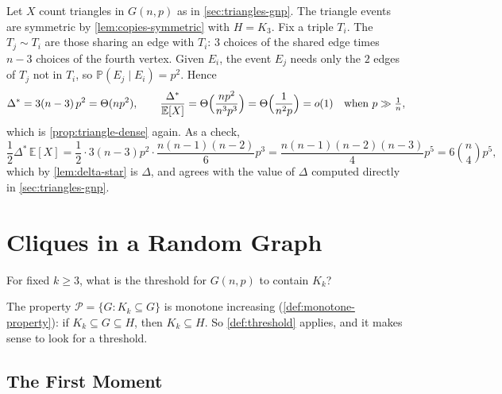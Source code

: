 \begin{eg}\label{eg:triangle-delta-star}
    Let \(X\) count triangles in \(G(n,p)\) as in \autoref{sec:triangles-gnp}. The triangle events are symmetric by \autoref{lem:copies-symmetric} with \(H = K_3\). Fix a triple \(T_i\). The \(T_j \sim T_i\) are those sharing an edge with \(T_i\): \(3\) choices of the shared edge times \(n-3\) choices of the fourth vertex. Given \(E_i\), the event \(E_j\) needs only the \(2\) edges of \(T_j\) not in \(T_i\), so \(\mathbb{P}(E_j \mid E_i) = p^{2}\). Hence
    \[
        \Delta^{*} = 3(n-3)\,p^{2} = \Theta(np^{2}),
        \qquad
        \frac{\Delta^{*}}{\mathbb{E}[X]} = \Theta\Bigl( \frac{np^{2}}{n^{3}p^{3}} \Bigr) = \Theta\Bigl( \frac{1}{n^{2}p} \Bigr) = o(1)
        \quad\text{when } p \gg \tfrac{1}{n},
    \]
    which is \autoref{prop:triangle-dense} again. As a check,
    \[
        \frac{1}{2}\Delta^{*}\,\mathbb{E}[X] = \frac{1}{2} \cdot 3(n-3)p^{2} \cdot \frac{n(n-1)(n-2)}{6}p^{3} = \frac{n(n-1)(n-2)(n-3)}{4}p^{5} = 6\binom{n}{4}p^{5},
    \]
    which by \autoref{lem:delta-star} is \(\Delta\), and agrees with the value of \(\Delta\) computed directly in \autoref{sec:triangles-gnp}.
\end{eg}

\section{Cliques in a Random Graph}\label{sec:cliques-gnp}

\begin{question}\label{q:clique-threshold}
    For fixed \(k \ge 3\), what is the threshold for \(G(n,p)\) to contain \(K_k\)?
\end{question}

The property \(\mathcal{P} = \{G : K_k \subseteq G\}\) is monotone increasing (\autoref{def:monotone-property}): if \(K_k \subseteq G \subseteq H\), then \(K_k \subseteq H\). So \autoref{def:threshold} applies, and it makes sense to look for a threshold.

\subsection{The First Moment}


